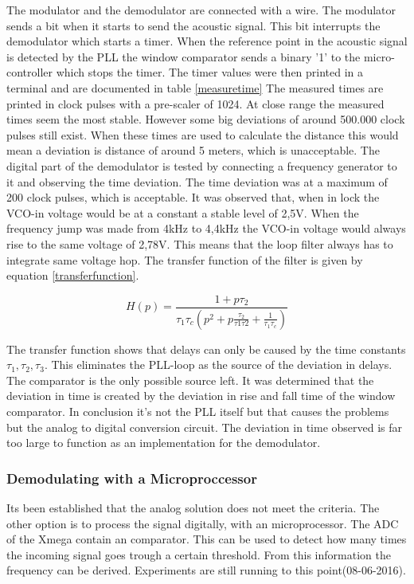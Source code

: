 \documentclass[10pt,a4paper]{article}
\begin{document}
The modulator and the demodulator are connected with a wire. The modulator sends a bit when it starts to send the acoustic signal. This bit interrupts the demodulator which starts a timer. When the reference point in the acoustic signal is detected by the PLL the window comparator sends a binary '1' to the micro-controller which stops the timer. The timer values were then printed in a terminal and are documented in table \ref{measuretime} The measured times are printed in clock pulses with a pre-scaler of 1024. At close range the measured times seem the most stable. However some big deviations of around 500.000 clock pulses still exist. When these times are used to calculate the distance this would mean a deviation is distance of around 5 meters, which is unacceptable. The digital part of the demodulator is tested by connecting a frequency generator to it and observing the time deviation. The time deviation was at a maximum of 200 clock pulses, which is acceptable. It was observed that, when in lock the VCO-in voltage would be at a constant a stable level of 2,5V. When the frequency jump was made from 4kHz to 4,4kHz the VCO-in voltage would always rise to the same voltage of 2,78V. This means that the loop filter always has to integrate same voltage hop. The transfer function of the filter is given by equation \ref{transferfunction}\cite{plldavid}.

\begin{equation}
H(p)=\frac{1+ p\tau_2}{\tau_1\tau_c(p^2+p\frac{\tau_2}{\tau1\tau2}+\frac{1}{\tau_1\tau_c})}
\label{eq:transferfunction}
\end{equation}

The transfer function shows that delays can only be caused by the time constants $\tau_1,\tau_2,\tau_3$. This eliminates the PLL-loop as the source of the deviation in delays. The comparator is the only possible source left. It was determined that the deviation in time is created by the deviation in rise and fall time of the window comparator. In conclusion it's not the PLL itself but that causes the problems but the analog to digital conversion circuit. The deviation in time observed is far too large to function as an implementation for the demodulator.

\subsubsection{Demodulating with a Microproccessor}
Its been established that the analog solution does not meet the criteria. The other option is to process the signal digitally, with an microprocessor. The ADC of the Xmega contain an comparator. This can be used to detect how many times the incoming signal goes trough a certain threshold. From this information the frequency can be derived. Experiments are still running to this point(08-06-2016).
\end{document}
